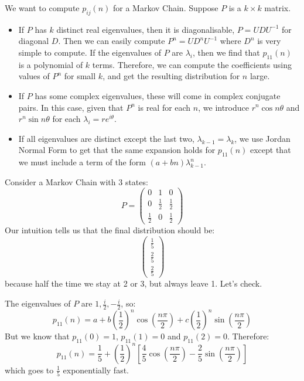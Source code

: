 \documentclass[../Main.tex]{subfiles}
\begin{document}
We want to compute $p_{ij}(n)$ for a Markov Chain. Suppose $P$ is a $k \times k$ matrix.
\begin{itemize}
    \item If $P$ has $k$ distinct real eigenvalues, then it is diagonalisable, $P = UDU^{-1}$ for diagonal $D$. Then we can easily compute $P^n = UD^n U^{-1}$ where $D^n$ is very simple to compute. If the eigenvalues of $P$ are $\lambda_i$, then we find that $p_{11}(n)$ is a polynomial of $k$ terms. Therefore, we can compute the coefficients using values of $P^n$ for small $k$, and get the resulting distribution for $n$ large.
    \item If $P$ has some complex eigenvalues, these will come in complex conjugate pairs. In this case, given that $P^n$ is real for each $n$, we introduce $r^n\cos{n\theta}$ and $r^n\sin{n\theta}$ for each $\lambda_i = re^{i\theta}$.
    \item If all eigenvalues are distinct except the last two, $\lambda_{k - 1} = \lambda_k$, we use Jordan Normal Form to get that the same expansion holds for $p_{11}(n)$ except that we must include a term of the form $(a + bn) \lambda_{k-1}^n$.
\end{itemize}
\begin{example}
    Consider a Markov Chain with 3 states:
    \begin{equation*}
        P=
        \begin{pmatrix}
            0 & 1 & 0 \\
            0 & \frac12 & \frac12 \\
            \frac12 & 0 & \frac12
        \end{pmatrix}
    \end{equation*}
    Our intuition tells us that the final distribution should be:
    \begin{equation*}
        \begin{pmatrix}\frac15 \\ \frac25 \\ \frac25\end{pmatrix}
    \end{equation*}
    because half the time we stay at 2 or 3, but always leave 1. Let's check.

    The eigenvalues of $P$ are $1, \frac{i}{2}, -\frac{i}{2}$, so:
    \begin{equation*}
        p_{11}(n) = a + b\left(\frac12\right)^n \cos\left(\frac{n\pi}{2}\right) + c\left(\frac{1}{2}\right)^n \sin\left(\frac{n\pi}{2}\right)
    \end{equation*}
    But we know that $p_{11}(0) = 1$, $p_{11}(1) = 0$ and $p_{11}(2) = 0$. Therefore:
    \begin{equation*}
        p_{11}(n) = \frac15 + \left(\frac12\right)^n \left[\frac45 \cos\left(\frac{n\pi}{2}\right) - \frac25 \sin\left(\frac{n\pi}{2}\right)\right]
    \end{equation*}
    which goes to $\frac15$ exponentially fast.
\end{example}
\end{document}
